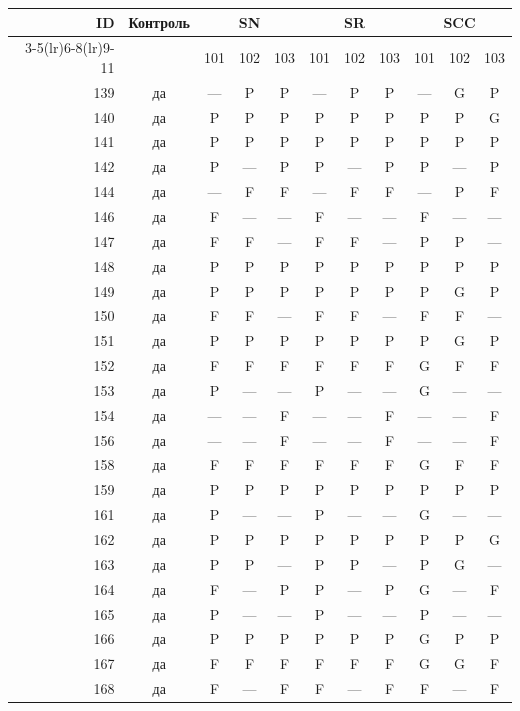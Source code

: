 \begin{table}[p]\centering\small
\begin{tabular*}{\textwidth}{@{\extracolsep{\fill}}rc*{9}{c}@{}}\toprule
ID & Контроль & \multicolumn{3}{c}{SN} & \multicolumn{3}{c}{SR} & \multicolumn{3}{c}{SCC}\\
\cmidrule(lr){3-5}\cmidrule(lr){6-8}\cmidrule(lr){9-11}
 & & 101 & 102 & 103 & 101 & 102 & 103 & 101 & 102 & 103\\\midrule
139 & да & — & P & P & — & P & P & — & G & P\\
140 & да & P & P & P & P & P & P & P & P & G\\
141 & да & P & P & P & P & P & P & P & P & P\\
142 & да & P & — & P & P & — & P & P & — & P\\
144 & да & — & F & F & — & F & F & — & P & F\\
146 & да & F & — & — & F & — & — & F & — & —\\
147 & да & F & F & — & F & F & — & P & P & —\\
148 & да & P & P & P & P & P & P & P & P & P\\
149 & да & P & P & P & P & P & P & P & G & P\\
150 & да & F & F & — & F & F & — & F & F & —\\
151 & да & P & P & P & P & P & P & P & G & P\\
152 & да & F & F & F & F & F & F & G & F & F\\
153 & да & P & — & — & P & — & — & G & — & —\\
154 & да & — & — & F & — & — & F & — & — & F\\
156 & да & — & — & F & — & — & F & — & — & F\\
158 & да & F & F & F & F & F & F & G & F & F\\
159 & да & P & P & P & P & P & P & P & P & P\\
161 & да & P & — & — & P & — & — & G & — & —\\
162 & да & P & P & P & P & P & P & P & P & G\\
163 & да & P & P & — & P & P & — & P & G & —\\
164 & да & F & — & P & P & — & P & G & — & F\\
165 & да & P & — & — & P & — & — & P & — & —\\
166 & да & P & P & P & P & P & P & G & P & P\\
167 & да & F & F & F & F & F & F & G & G & F\\
168 & да & F & — & F & F & — & F & F & — & F\\

\end{tabular*}
\end{table}
